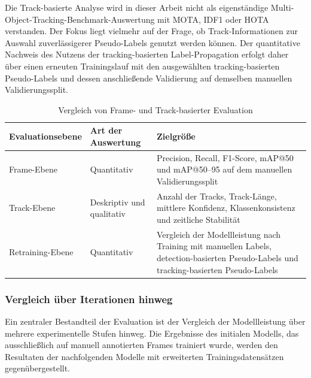 Die Track-basierte Analyse wird in dieser Arbeit nicht als eigenständige
Multi-Object-Tracking-Benchmark-Auswertung mit MOTA, IDF1 oder HOTA
verstanden. Der Fokus liegt vielmehr auf der Frage, ob Track-Informationen zur
Auswahl zuverlässigerer Pseudo-Labels genutzt werden können. Der quantitative
Nachweis des Nutzens der tracking-basierten Label-Propagation erfolgt daher über
einen erneuten Trainingslauf mit den ausgewählten tracking-basierten Pseudo-Labels
und dessen anschließende Validierung auf demselben manuellen Validierungssplit.

\begin{table}[H]
    \centering
    \caption{Vergleich von Frame- und Track-basierter Evaluation}
    \label{tab:frame_track_eval}
    \begin{tabular}{p{3.0cm}p{3.5cm}p{6.8cm}}
        \hline
        \textbf{Evaluationsebene} & \textbf{Art der Auswertung} & \textbf{Zielgröße}                                                            \\
        \hline
        Frame-Ebene               &
        Quantitativ               &
        Precision, Recall, F1-Score, mAP@50 und mAP@50--95 auf dem manuellen Validierungssplit                                                  \\
        \hline
        Track-Ebene               &
        Deskriptiv und qualitativ &
        Anzahl der Tracks, Track-Länge, mittlere Konfidenz, Klassenkonsistenz und zeitliche Stabilität                                          \\
        \hline
        Retraining-Ebene          &
        Quantitativ               &
        Vergleich der Modellleistung nach Training mit manuellen Labels, detection-basierten Pseudo-Labels und tracking-basierten Pseudo-Labels \\
        \hline
    \end{tabular}
\end{table}

\subsubsection{Vergleich über Iterationen hinweg}

Ein zentraler Bestandteil der Evaluation ist der Vergleich der Modellleistung über
mehrere experimentelle Stufen hinweg. Die Ergebnisse des initialen Modells, das
ausschließlich auf manuell annotierten Frames trainiert wurde, werden den
Resultaten der nachfolgenden Modelle mit erweiterten Trainingsdatensätzen
gegenübergestellt.

